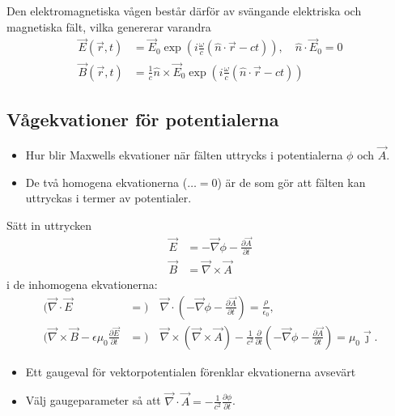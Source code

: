 \documentclass[%
oneside,                 %
final,                   %
10pt]{article}
\begin{document}
\noindent
Den elektromagnetiska vågen består därför av svängande elektriska och magnetiska fält, vilka genererar varandra
\begin{align}
\vec{E}(\vec{r},t) &= \vec{E}_0 \exp\left( i \frac{\omega}{c}(\hat{n} \cdot \vec{r} - c t ) \right), \quad \hat{n} \cdot \vec{E}_0 = 0  \\
\vec{B}(\vec{r},t) &= \frac{1}{c} \hat{n} \times \vec{E}_0 \exp\left( i \frac{\omega}{c}(\hat{n} \cdot \vec{r} - c t ) \right)  
\end{align}

\subsection{Vågekvationer för potentialerna}

\begin{itemize}
\item Hur blir Maxwells ekvationer när fälten uttrycks i potentialerna $\phi$ och $\vec A$.

\item De två homogena ekvationerna ($\ldots = 0$) är de som gör att fälten kan uttryckas i termer av potentialer. 
\end{itemize}

\noindent
Sätt in uttrycken
\begin{align}
\vec{E} &= -\vec{\nabla} \phi - \frac{\partial \vec{A}}{\partial t} \nonumber \\
\vec{B} &= \vec{\nabla} \times \vec{A} \nonumber
\end{align}
i de inhomogena ekvationerna:
\begin{align*}
\Big( \vec{\nabla} \cdot \vec{E} &= \Big) \quad \vec{\nabla}\cdot(-\vec{\nabla}\phi-\frac{\partial \vec A}{\partial t}) = \frac{\rho}{\epsilon_0}, \\
\Big( \vec{\nabla} \times \vec{B} - \epsilon \mu_0 \frac{\partial \vec{E}}{\partial t}
&= \Big) \quad \vec{\nabla}\times(\vec{\nabla}\times\vec A) - \frac{1}{c^2} \frac{\partial}{\partial t} (-\vec{\nabla}\phi-\frac{\partial \vec A}{\partial t})=\mu_0\vec\jmath .
\end{align*}
\begin{itemize}
\item Ett gaugeval för vektorpotentialen förenklar ekvationerna avsevärt 

\item Välj gaugeparameter så att $\vec{\nabla}\cdot\vec A = - \frac{1}{c^2} \frac{\partial \phi}{\partial t}$. 
\end{itemize}
\end{document}
